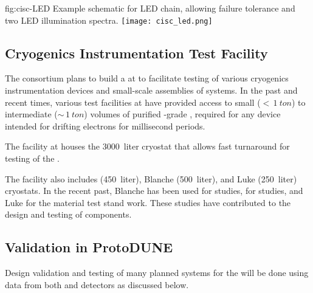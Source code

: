 \begin{dunefigure}{fig:cisc-LED}
  {Example schematic for LED chain, allowing failure tolerance and two LED illumination spectra.}
  \texttt{[image: cisc\_led.png]}
\end{dunefigure}


\subsection{Cryogenics Instrumentation Test Facility}
The  consortium plans to build a  at  to facilitate testing of various cryogenics instrumentation devices and small-scale assemblies of  systems. 
In the past and recent times, various test facilities at  have provided access to small ($<\,\SI{1}{ton}$) to intermediate ($\sim\,\SI{1}{ton}$) volumes of purified -grade , required for %
any device intended for drifting electrons for millisecond periods. 

The  facility at  houses the  \SI {3000} {liter} cryostat that allows fast turnaround for testing of the  . 

The  facility also includes  (\SI {450} {liter}), Blanche (\SI {500} {liter}), and Luke (\SI {250} {liter}) cryostats. %
In the recent past, Blanche has been used for  studies,   for  studies, and Luke for the material test stand work. These studies have contributed to the design and testing of   components.

\subsection{Validation in ProtoDUNE}
\label{sec:pddp-cryo-valid}


Design validation and testing of many planned  systems for the    will be done using data from both  and  detectors as discussed below.

